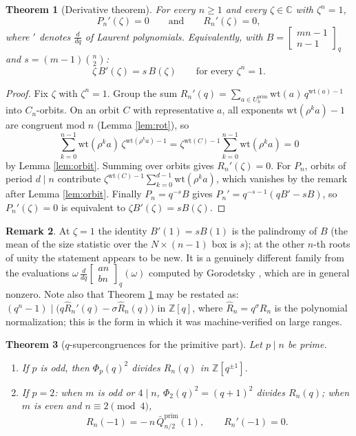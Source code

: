 \documentclass[11pt]{amsart}
\newtheorem{theorem}{Theorem}[section]
\theoremstyle{definition}
\newtheorem{remark}[theorem]{Remark}
\newcommand{\ZZ}{\mathbb{Z}}
\newcommand{\CC}{\mathbb{C}}
\newcommand{\wt}{\mathrm{wt}}
\newcommand{\prim}{\mathrm{prim}}
\newcommand{\qbin}[2]{\begin{bmatrix}#1\\#2\end{bmatrix}_q}
\begin{document}
\begin{theorem}[Derivative theorem]\label{thm:deriv}
For every $n\ge1$ and every $\zeta\in\CC$ with $\zeta^n=1$,
\[
P_n'(\zeta)=0
\qquad\text{and}\qquad
R_n'(\zeta)=0 ,
\]
where $'$ denotes $\frac{d}{dq}$ of Laurent polynomials. Equivalently, with $B=\qbin{mn-1}{n-1}$ and $s=(m-1)\binom n2$:
\[
\zeta\,B'(\zeta)= s\,B(\zeta)\qquad\text{for every }\zeta^n=1 .
\]
\end{theorem}

\begin{proof}
Fix $\zeta$ with $\zeta^n=1$. Group the sum $R_n'(q)=\sum_{a\in U^{\prim}_n}\wt(a)\,q^{\wt(a)-1}$ into $C_n$-orbits. On an orbit $C$ with representative $a$, all exponents $\wt(\rho^ka)-1$ are congruent mod $n$ (Lemma \ref{lem:rot}), so
\[
\sum_{k=0}^{n-1}\wt(\rho^ka)\,\zeta^{\wt(\rho^ka)-1}=\zeta^{\wt(C)-1}\sum_{k=0}^{n-1}\wt(\rho^ka)=0
\]
by Lemma \ref{lem:orbit}. Summing over orbits gives $R_n'(\zeta)=0$. For $P_n$, orbits of period $d\mid n$ contribute $\zeta^{\wt(C)-1}\sum_{k=0}^{d-1}\wt(\rho^ka)$, which vanishes by the remark after Lemma \ref{lem:orbit}. Finally $P_n=q^{-s}B$ gives $P_n'=q^{-s-1}(qB'-sB)$, so $P_n'(\zeta)=0$ is equivalent to $\zeta B'(\zeta)=sB(\zeta)$.
\end{proof}

\begin{remark}
At $\zeta=1$ the identity $B'(1)=sB(1)$ is the palindromy of $B$ (the mean of the size statistic over the $N\times(n-1)$ box is $s$); at the other $n$-th roots of unity the statement appears to be new. It is a genuinely different family from the evaluations $\omega\, \frac{d}{dq}\qbin{an}{bn}(\omega)$ computed by Gorodetsky \cite[Thm.~2.6]{Gorodetsky}, which are in general nonzero. Note also that Theorem \ref{thm:deriv} may be restated as: $(q^n-1)\mid \big(q\hat R_n'(q)-\sigma \hat R_n(q)\big)$ in $\ZZ[q]$, where $\hat R_n=q^{\sigma}R_n$ is the polynomial normalization; this is the form in which it was machine-verified on large ranges.
\end{remark}

\begin{theorem}[$q$-supercongruences for the primitive part]\label{thm:qsuper}
Let $p\mid n$ be prime.
\begin{enumerate}
\item If $p$ is odd, then $\Phi_p(q)^2$ divides $R_n(q)$ in $\ZZ[q^{\pm1}]$.
\item If $p=2$: when $m$ is odd or $4\mid n$, $\Phi_2(q)^2=(q+1)^2$ divides $R_n(q)$; when $m$ is even and $n\equiv2\pmod 4$,
\[
R_n(-1)=-\,n\,\bar Q^{\prim}_{n/2}(1),\qquad R_n'(-1)=0 .
\]
\end{enumerate}
\end{theorem}
\end{document}
